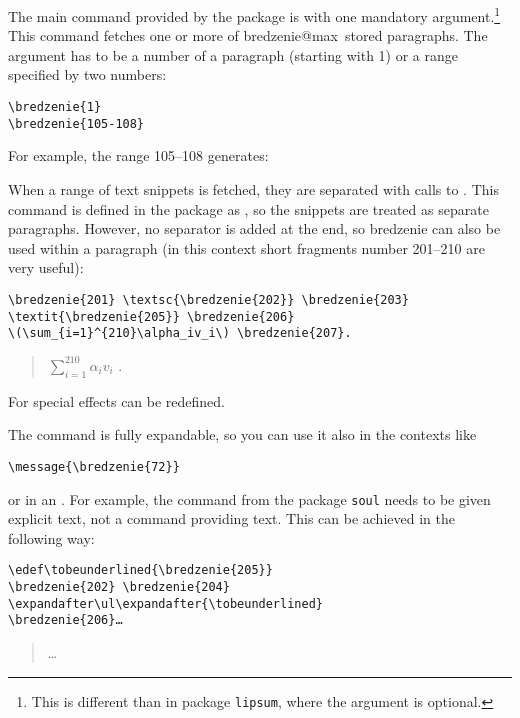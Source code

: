 \documentclass{ltxdoc}
\begin{document}
\begin{macro}{\bredzenie}
The main command provided by the package is  with one mandatory
argument.\footnote{This is different than in package \texttt{lipsum},
where the argument is optional.}  This command fetches one or more of \csname
bredzenie@max\endcsname\ stored paragraphs.  The
argument has to be a number of a paragraph (starting with 1) or a
range specified by two numbers:
\begin{verbatim}
\bredzenie{1}
\bredzenie{105-108}
\end{verbatim}
For example, the range 105–108 generates:
\begin{quotation}%
\end{quotation}

\begin{macro}{\BredzenieSep}
  When a range of text snippets is fetched, they are separated with
  calls to .  This command is defined in the package
  as , so the snippets are treated as separate paragraphs.
  However, no separator is added at the end, so bredzenie can also be
  used within a paragraph (in this context short fragments number
  201–210 are very useful):
\begin{verbatim}
\bredzenie{201} \textsc{\bredzenie{202}} \bredzenie{203}
\textit{\bredzenie{205}} \bredzenie{206} 
\(\sum_{i=1}^{210}\alpha_iv_i\) \bredzenie{207}.
\end{verbatim}
\begin{quotation}
 \textsc{} 
\textit{}  
\(\sum_{i=1}^{210}\alpha_iv_i\) .
\end{quotation}
For special effects  can be redefined.
\end{macro}

The command  is fully expandable, so you can use it also
in the contexts like
\begin{verbatim}
\message{\bredzenie{72}}
\end{verbatim}
or in an . For example, the command  from the package
\texttt{soul} needs to be given explicit text, not a command providing
text.  This can be achieved in the following way:
\begin{verbatim}
\edef\tobeunderlined{\bredzenie{205}}
\bredzenie{202} \bredzenie{204}
\expandafter\ul\expandafter{\tobeunderlined}
\bredzenie{206}…
\end{verbatim}
\begin{quotation}
\edef\tobeunderlined{\bredzenie{205}}
 
\expandafter\ul\expandafter{\tobeunderlined}
…
\end{quotation}
\end{macro}
\end{document}
